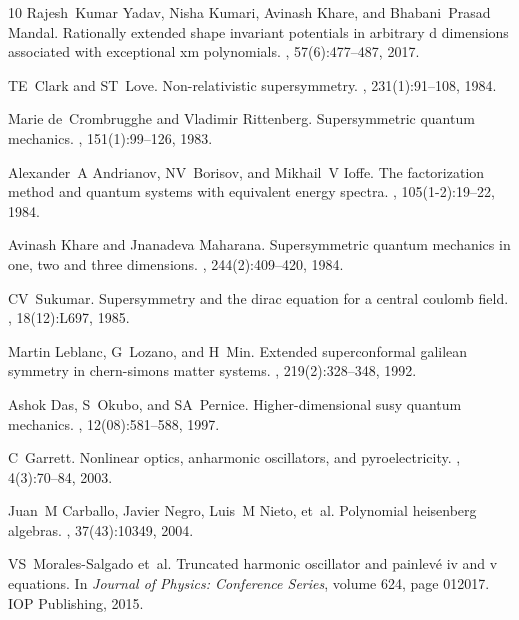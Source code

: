\documentclass[12pt]{article}
\numberwithin{equation}{section} %
\begin{document}
\begin{thebibliography}{10}
Rajesh~Kumar Yadav, Nisha Kumari, Avinash Khare, and Bhabani~Prasad Mandal.
\newblock Rationally extended shape invariant potentials in arbitrary d
  dimensions associated with exceptional xm polynomials.
, 57(6):477--487, 2017.

TE~Clark and ST~Love.
\newblock Non-relativistic supersymmetry.
, 231(1):91--108, 1984.

Marie de~Crombrugghe and Vladimir Rittenberg.
\newblock Supersymmetric quantum mechanics.
, 151(1):99--126, 1983.

Alexander~A Andrianov, NV~Borisov, and Mikhail~V Ioffe.
\newblock The factorization method and quantum systems with equivalent energy
  spectra.
, 105(1-2):19--22, 1984.

Avinash Khare and Jnanadeva Maharana.
\newblock Supersymmetric quantum mechanics in one, two and three dimensions.
, 244(2):409--420, 1984.

CV~Sukumar.
\newblock Supersymmetry and the dirac equation for a central coulomb field.
, 18(12):L697,
  1985.

Martin Leblanc, G~Lozano, and H~Min.
\newblock Extended superconformal galilean symmetry in chern-simons matter
  systems.
, 219(2):328--348, 1992.

Ashok Das, S~Okubo, and SA~Pernice.
\newblock Higher-dimensional susy quantum mechanics.
, 12(08):581--588, 1997.

C~Garrett.
\newblock Nonlinear optics, anharmonic oscillators, and pyroelectricity.
, 4(3):70--84, 2003.

Juan~M Carballo, Javier Negro, Luis~M Nieto, et~al.
\newblock Polynomial heisenberg algebras.
, 37(43):10349,
  2004.

VS~Morales-Salgado et~al.
\newblock Truncated harmonic oscillator and painlev{\'e} iv and v equations.
\newblock In {\em Journal of Physics: Conference Series}, volume 624, page
  012017. IOP Publishing, 2015.


\end{thebibliography}
\end{document}
